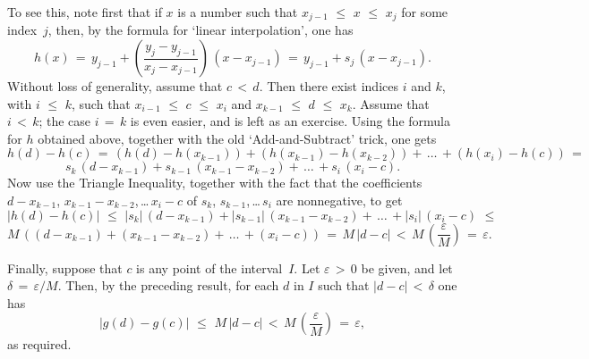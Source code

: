         To see this, note first that if $x$ is a number such that $x_{j-1}\,\,{\leq}\,\,x\,\,{\leq}\,\,x_{j}$ for some index~$j$,
    then, by the formula for `linear interpolation', one has
        \begin{displaymath}
        h(x) \,=\, y_{j-1} + \left(\frac{y_{j}-y_{j-1}}{x_{j}-x_{j-1}}\right)\,(x-x_{j-1})
     \,=\, 
        y_{j-1} + s_{j}\,(x - x_{j-1}).
        \end{displaymath}
    Without loss of generality, assume that $c\,<\,d$. Then there exist indices $i$ and $k$, with $i\,\,{\leq}\,\,k$,
    such that $x_{i-1}\,\,{\leq}\,\,c\,\,{\leq}\,\,x_{i}$ and $x_{k-1}\,\,{\leq}\,\,d\,\,{\leq}\,\,x_{k}$.
    Assume that $i\,<\,k$; the case $i \,=\, k$ is even easier, and is left as an exercise. Using the formula for $h$ obtained above, together with the old `Add-and-Subtract' trick, one gets
        \begin{displaymath}
        h(d)-h(c)
         \,=\, 
        (h(d) - h(x_{k-1})) + (h(x_{k-1})-h(x_{k-2})) + \,{\ldots}\, + (h(x_{i}) - h(c))
     \,=\, 
        \end{displaymath}
        \begin{displaymath}
        s_{k}\,(d-x_{k-1}) + s_{k-1}\,(x_{k-1} - x_{k-2}) + \,{\ldots}\, + s_{i}\,(x_{i}-c).
        \end{displaymath}
    Now use the Triangle Inequality, together with the fact that the coefficients $d-x_{k-1}$, $x_{k-1}-x_{k-2}$,\,{\ldots}\,$x_{i}-c$ of $s_{k}$, $s_{k-1}$,\,{\ldots}\,$s_{i}$ are nonnegative, to get
        \begin{displaymath}
        |h(d)-h(c)|\,\,{\leq}\,\,|s_{k}|\,(d-x_{k-1}) + |s_{k-1}|\,(x_{k-1}-x_{k-2}) + \,{\ldots}\,+ |s_{i}|\,(x_{i}-c)
    \,\,{\leq}\,\,
        \end{displaymath}
        \begin{displaymath}
        M\,((d-x_{k-1}) + (x_{k-1}-x_{k-2}) + \,{\ldots}\, + (x_{i}-c))
     \,=\, 
        M\,|d-c|\,<\,M\,\left(\frac{{\varepsilon}}{M}\right) \,=\, {\varepsilon}.
        \end{displaymath}

        Finally, suppose that $c$ is any point of the interval~$I$. Let ${\varepsilon}\,>\,0$ be given, and let ${\delta} \,=\, {\varepsilon}/M$.
    Then, by the preceding result, for each $d$ in $I$ such that $|d-c|\,<\,{\delta}$ one has
        \begin{displaymath}
        |g(d)-g(c)|\,\,{\leq}\,\,M\,|d-c|\,<\,M\,\left(\frac{{\varepsilon}}{M}\right) \,=\, {\varepsilon},
        \end{displaymath}
    as required.



